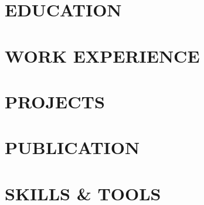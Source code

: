 \documentclass[11pt,letterpaper]{article}
\begin{document}

\section{EDUCATION}

\section{WORK EXPERIENCE}

\resumeDraftGap

\section{PROJECTS}


\section{PUBLICATION}

\section{SKILLS \& TOOLS}

\end{document}
